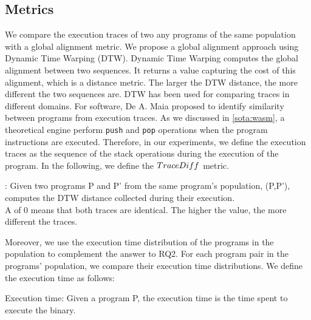 \subsection*{Metrics}
\label{rq2:metrics}

We compare the execution traces of two any programs of the same population with a global alignment metric. We propose a global alignment approach using Dynamic Time Warping (DTW).
Dynamic Time Warping \cite{NEEDLEMAN1970443} computes the global alignment between two sequences. It returns a value capturing the cost of this alignment, which is a distance metric. The larger the DTW distance, the more different the two sequences are.
DTW has been used for comparing traces in different domains. For software, De A. Maia \etal \cite{ Maia08usinga} proposed to identify similarity between programs from execution traces.
As we discussed in \autoref{sota:wasm}, a theoretical \wasm engine perform \texttt{push} and \texttt{pop} operations when the program instructions are executed. Therefore, in our experiments, we define the execution traces as the sequence of the stack operations during the execution of the \wasm program. 
In the following, we define the $TraceDiff$ metric. 
 

\begin{metric}{\DTW{}:}
\label{metric:stack}
\normalfont 
	Given two programs P and P' from the same program's population, \DTW{}(P,P'), computes the DTW distance collected during their execution. \\
	A \DTW{} of $0$ means that both traces are identical.
	The higher the value, the more different the traces. 
\end{metric}



Moreover, we use the execution time distribution of the programs in the population to complement the answer to RQ2. For each program pair in the programs' population, we compare their execution time distributions. We define the execution time as follows:

\begin{metric}{Execution time:}\label{metric:time}
    \normalfont 
	Given a \wasm program P, the execution time is the time spent to execute the binary.
\end{metric}




